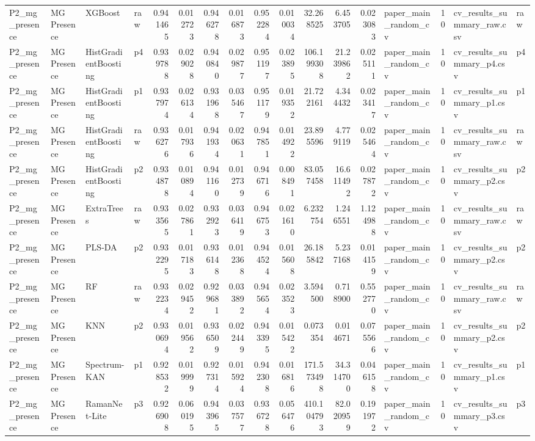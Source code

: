 \begin{tabular}{llllrrrrrrrrrlrll}
P2_mg_presence & MG Presence & XGBoost & raw & 0.941465 & 0.012723 & 0.946278 & 0.016873 & 0.952284 & 0.010034 & 32.268525 & 6.453705 & 0.023083 & paper_main_random_cv & 10 & cv_results_summary_raw.csv & raw \\
P2_mg_presence & MG Presence & HistGradientBoosting & p4 & 0.939788 & 0.029028 & 0.940840 & 0.029877 & 0.951197 & 0.023895 & 106.199308 & 21.239862 & 0.025111 & paper_main_random_cv & 10 & cv_results_summary_p4.csv & p4 \\
P2_mg_presence & MG Presence & HistGradientBoosting & p1 & 0.937974 & 0.026134 & 0.931968 & 0.035467 & 0.951179 & 0.019352 & 21.722161 & 4.344432 & 0.023417 & paper_main_random_cv & 10 & cv_results_summary_p1.csv & p1 \\
P2_mg_presence & MG Presence & HistGradientBoosting & raw & 0.936276 & 0.017936 & 0.941934 & 0.020631 & 0.947851 & 0.014922 & 23.895596 & 4.779119 & 0.025464 & paper_main_random_cv & 10 & cv_results_summary_raw.csv & raw \\
P2_mg_presence & MG Presence & HistGradientBoosting & p2 & 0.934878 & 0.010894 & 0.941160 & 0.012739 & 0.946716 & 0.008491 & 83.057458 & 16.611492 & 0.027872 & paper_main_random_cv & 10 & cv_results_summary_p2.csv & p2 \\
P2_mg_presence & MG Presence & ExtraTrees & raw & 0.933565 & 0.027861 & 0.932923 & 0.036419 & 0.946753 & 0.021610 & 6.232754 & 1.246551 & 1.124988 & paper_main_random_cv & 10 & cv_results_summary_raw.csv & raw \\
P2_mg_presence & MG Presence & PLS-DA & p2 & 0.932295 & 0.017183 & 0.936148 & 0.012368 & 0.944524 & 0.015608 & 26.185842 & 5.237168 & 0.014159 & paper_main_random_cv & 10 & cv_results_summary_p2.csv & p2 \\
P2_mg_presence & MG Presence & RF & raw & 0.932234 & 0.029452 & 0.929681 & 0.033892 & 0.945654 & 0.023523 & 3.594500 & 0.718900 & 0.552770 & paper_main_random_cv & 10 & cv_results_summary_raw.csv & raw \\
P2_mg_presence & MG Presence & KNN & p2 & 0.930694 & 0.019562 & 0.936509 & 0.022449 & 0.943395 & 0.015422 & 0.073354 & 0.014671 & 0.075566 & paper_main_random_cv & 10 & cv_results_summary_p2.csv & p2 \\
P2_mg_presence & MG Presence & Spectrum-KAN & p1 & 0.928532 & 0.019999 & 0.927314 & 0.015924 & 0.942308 & 0.016816 & 171.573498 & 34.314700 & 0.046158 & paper_main_random_cv & 10 & cv_results_summary_p1.csv & p1 \\
P2_mg_presence & MG Presence & RamanNet-Lite & p3 & 0.926908 & 0.060195 & 0.943965 & 0.037577 & 0.936728 & 0.056476 & 410.104793 & 82.020959 & 0.191972 & paper_main_random_cv & 10 & cv_results_summary_p3.csv & p3 \\

\end{tabular}
